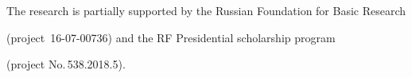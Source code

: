 

















\Ack


\noindent


The research is partially supported by the Russian Foundation for Basic Research 


(project~16-07-00736) and the RF Presidential scholarship program 


(project No.\,538.2018.5).


 








\renewcommand{\bibname}{\protect\rmfamily References}







